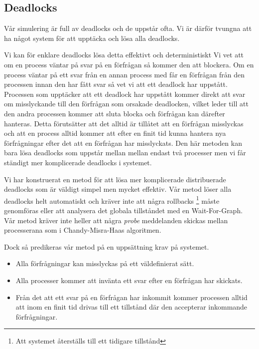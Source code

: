 \subsection{Deadlocks}

Vår simulering är full av deadlocks och de uppstår ofta. Vi är därför tvungna att ha något system för att upptäcka och lösa alla deadlocks.

Vi kan för enklare deadlocks lösa detta effektivt och deterministiskt Vi vet att om en process väntar på  svar på en förfrågan så kommer den att blockera. Om en process väntar på ett svar från en annan process med får en förfrågan från den processen innan den har fått svar så vet vi att ett deadlock har uppstått. Processen som upptäcker att ett deadlock har uppstått kommer direkt att svar om misslyckande till den förfrågan som orsakade deadlocken, vilket leder till att den andra processen kommer att sluta blocka och förfrågan kan därefter hanteras. Detta förutsätter att det alltid är tillåtet att en förfrågan misslyckas och att en process alltid kommer att efter en finit tid kunna hantera nya förfrågningar efter det att en förfrågan har misslyckats.
Den här metoden kan bara lösa deadlocks som uppstår mellan mellan endast två processer men vi får ständigt mer komplicerade deadlocks i systemet.

Vi har konstruerat en metod för att lösa mer komplicerade distribuerade deadlocks som är väldigt simpel men mycket effektiv. Vår metod löser alla deadlocks helt automatiskt och kräver inte att några rollbacks \footnote{Att systemet återställs till ett tidigare tillstånd} måste genomföras eller att analysera det globala tillståndet med en Wait-For-Graph.\citep{Reference6} Vår metod kräver inte heller att några \emph{probe} meddelanden skickas mellan processerana som i Chandy-Misra-Haas algoritmen.\citep{Reference7}

Dock så predikeras vår metod på en uppsättning krav på systemet.

\begin{itemize}
\item Alla förfrågningar kan misslyckas på ett väldefinierat sätt.

\item Alla processer kommer att invänta ett svar efter en förfrågan har skickats. 

\item Från det att ett svar på en förfrågan har inkommit kommer processen alltid att inom en finit tid drivas till ett tillstånd där den accepterar inkommande förfrågningar.
\end{itemize}

